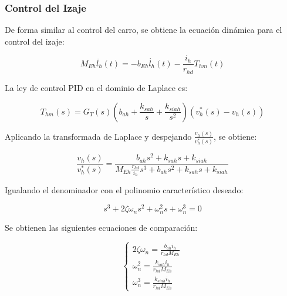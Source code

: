 \documentclass{article}
\begin{document}
        \subsubsection{Control del Izaje}

            De forma similar al control del carro, se obtiene la ecuación dinámica para el control del izaje:
            
            \begin{equation}
                M_{Eh} \ddot{l_h}(t) = -b_{Eh} \dot{l_h}(t) - \frac{i_h}{r_{hd}} T_{hm}(t)
            \end{equation}
            
            La ley de control PID en el dominio de Laplace es:
            
            \begin{equation}
                T_{hm}(s) = G_T(s) \left( b_{ah} + \frac{k_{sah}}{s} + \frac{k_{siah}}{s^2} \right) \left( v_h^*(s) - v_h(s) \right)
            \end{equation}
            
            Aplicando la transformada de Laplace y despejando \(\frac{v_h(s)}{v_h^*(s)}\), se obtiene:
            
            \begin{equation}
                \frac{v_h(s)}{v_h^*(s)} = \frac{b_{ah} s^2 + k_{sah} s + k_{siah}}{M_{Eh} \frac{r_{hd}}{i_h} s^3 + b_{ah} s^2 + k_{sah} s + k_{siah}}
            \end{equation}
            
            Igualando el denominador con el polinomio característico deseado:
            
            \begin{equation}
                s^3 + 2 \zeta \omega_n s^2 + \omega_n^2 s + \omega_n^3 = 0
            \end{equation}
            
            Se obtienen las siguientes ecuaciones de comparación:
            
            \begin{equation}
                \begin{cases}
                    2 \zeta \omega_n = \frac{b_{ah} i_h}{r_{hd} M_{Eh}} \\
                    \omega_n^2 = \frac{k_{sah} i_h}{r_{hd} M_{Eh}} \\
                    \omega_n^3 = \frac{k_{siah} i_h}{r_{hd} M_{Eh}}
                \end{cases}
            \end{equation}
            
\end{document}
